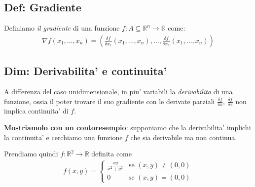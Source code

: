 \documentclass{article}
\begin{document}
\subsection{Def: Gradiente}

Definiamo \emph{il gradiente} di una funzione $f: A \subseteq \mathbb{R}^n \to
\mathbb{R}$ come:
\begin{align*}
  \nabla f(x_1, \ldots, x_n) = (\frac{\delta f}{\delta x_1}(x_1, \ldots, x_n), \ldots, \frac{\delta f}{\delta x_n}(x_1, \ldots, x_n))
\end{align*}

\subsection{Dim: Derivabilita' e continuita'}

A differenza del caso unidimensionale, in piu' variabili la \emph{derivabilita}
di una funzione, ossia il poter trovare il suo gradiente con le derivate parziali
$\frac{\delta f}{\delta x}, \, \frac{\delta f}{\delta x}$ non implica continuita' di $f$.

\textbf{Mostriamolo con un contoresempio}: supponiamo che la derivabilita' implichi
la continuita' e cerchiamo una funzione $f$ che sia derivabile ma non continua.

Prendiamo quindi $f: \mathbb{R}^2 \to \mathbb{R}$ definita come
\begin{align*}
  f(x, y) = \begin{cases}
    \frac{xy}{x^2 + y^2} &\text{se } (x, y) \neq (0, 0) \\
    0 &\text{se } (x, y) = (0, 0)
  \end{cases}
\end{align*}
\end{document}
